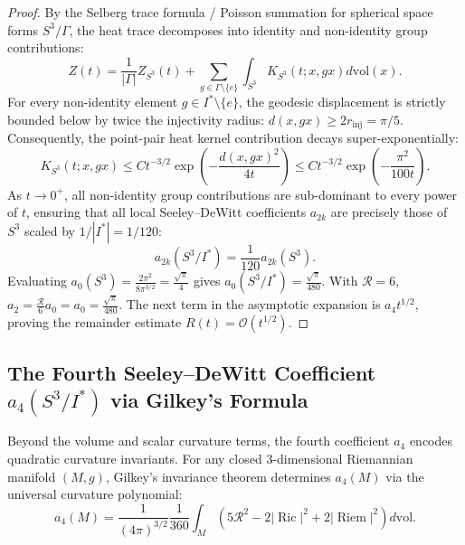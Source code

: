 \documentclass[11pt,a4paper]{article}
\theoremstyle{definition}
\DeclareMathOperator{\Ric}{Ric}
\DeclareMathOperator{\Riem}{Riem}
\begin{document}
\begin{proof}
By the Selberg trace formula / Poisson summation for spherical space forms $S^3 / \Gamma$, the heat trace decomposes into identity and non-identity group contributions:
\begin{equation}
Z(t) = \frac{1}{|\Gamma|} Z_{S^3}(t) + \sum_{g \in \Gamma \setminus \{e\}} \int_{S^3} K_{S^3}(t; x, g x) d\mathrm{vol}(x).
\end{equation}
For every non-identity element $g \in I^* \setminus \{e\}$, the geodesic displacement is strictly bounded below by twice the injectivity radius: $d(x, g x) \ge 2 r_{\mathrm{inj}} = \pi / 5$. Consequently, the point-pair heat kernel contribution decays super-exponentially:
\begin{equation}
K_{S^3}(t; x, g x) \le C t^{-3/2} \exp\left( - \frac{d(x, g x)^2}{4t} \right) \le C t^{-3/2} \exp\left( - \frac{\pi^2}{100 t} \right).
\end{equation}
As $t \to 0^+$, all non-identity group contributions are sub-dominant to every power of $t$, ensuring that all local Seeley--DeWitt coefficients $a_{2k}$ are precisely those of $S^3$ scaled by $1/|I^*| = 1/120$:
\begin{equation}
a_{2k}(S^3 / I^*) = \frac{1}{120} a_{2k}(S^3).
\end{equation}
Evaluating $a_0(S^3) = \frac{2 \pi^2}{8 \pi^{3/2}} = \frac{\sqrt{\pi}}{4}$ gives $a_0(S^3/I^*) = \frac{\sqrt{\pi}}{480}$. With $\mathcal{R} = 6$, $a_2 = \frac{\mathcal{R}}{6} a_0 = a_0 = \frac{\sqrt{\pi}}{480}$. The next term in the asymptotic expansion is $a_4 t^{1/2}$, proving the remainder estimate $R(t) = \mathcal{O}(t^{1/2})$.
\end{proof}

\subsection{The Fourth Seeley--DeWitt Coefficient $a_4(S^3 / I^*)$ via Gilkey's Formula}
Beyond the volume and scalar curvature terms, the fourth coefficient $a_4$ encodes quadratic curvature invariants. For any closed 3-dimensional Riemannian manifold $(M, g)$, Gilkey's invariance theorem \cite{Gilkey1995} determines $a_4(M)$ via the universal curvature polynomial:
\begin{equation}
a_4(M) = \frac{1}{(4\pi)^{3/2}} \frac{1}{360} \int_M \left( 5 \mathcal{R}^2 - 2 |\Ric|^2 + 2 |\Riem|^2 \right) d\mathrm{vol}.
\end{equation}
\end{document}

